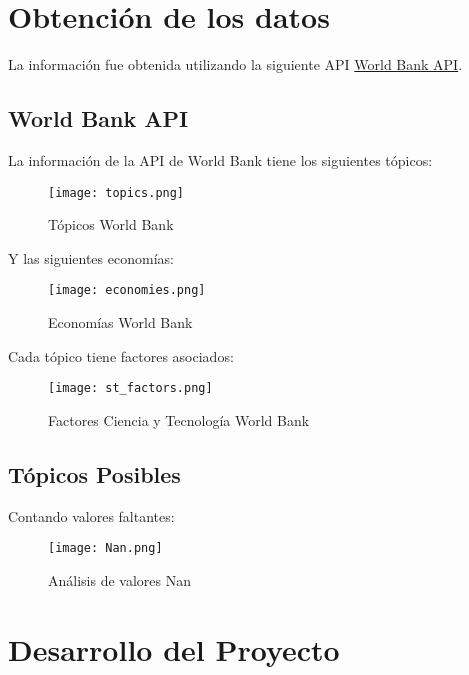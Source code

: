 \documentclass{other/docTemplate}
\begin{document}
\clearpage
\section{Obtención de los datos}
La información fue obtenida utilizando la siguiente API \href{https://datahelpdesk.worldbank.org/knowledgebase/topics/125589}{World Bank API}.


\subsection{World Bank API}

La información de la API de World Bank tiene los siguientes tópicos:

\begin{figure}[htbp!]
  \centering
  \texttt{[image: topics.png]}
  \caption{Tópicos World Bank}
  \label{fig:topics}
\end{figure}

\newpage

Y las siguientes economías:

\begin{figure}[htbp!]
  \centering
  \texttt{[image: economies.png]}
  \caption{Economías World Bank}
  \label{fig:economies}
\end{figure}

Cada tópico tiene factores asociados:

\begin{figure}[htbp!]
  \centering
  \texttt{[image: st\_factors.png]}
  \caption{Factores Ciencia y Tecnología World Bank}
  \label{fig:stfactors}
\end{figure}


\subsection{Tópicos Posibles}

Contando valores faltantes:

\begin{figure}[htbp!]
  \centering
  \texttt{[image: Nan.png]}
  \caption{Análisis de valores Nan}
  \label{fig:nan}
\end{figure}

\clearpage
\section{Desarrollo del Proyecto} 
\end{document}
